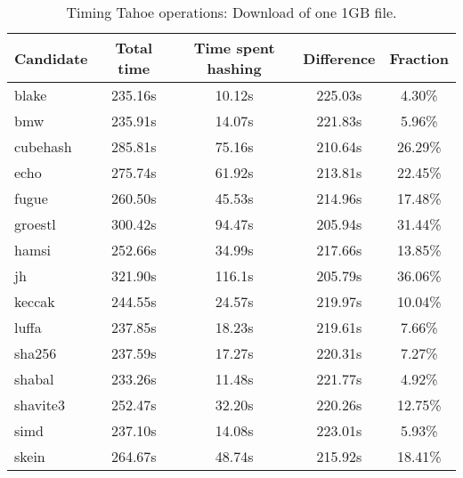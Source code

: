 \begin{table}[h]
  \centering
  \begin{tabular}{ | l | c | c | c | c | }
    \hline
    Candidate & Total time & Time spent hashing & Difference & Fraction \\ \hline
    blake & 235.16s & 10.12s & 225.03s & 4.30\% \\ \hline
    bmw & 235.91s & 14.07s & 221.83s & 5.96\% \\ \hline
    cubehash & 285.81s & 75.16s & 210.64s & 26.29\% \\ \hline
    echo & 275.74s & 61.92s & 213.81s & 22.45\% \\ \hline
    fugue & 260.50s & 45.53s & 214.96s & 17.48\% \\ \hline
    groestl & 300.42s & 94.47s & 205.94s & 31.44\% \\ \hline
    hamsi & 252.66s & 34.99s & 217.66s & 13.85\% \\ \hline
    jh & 321.90s & 116.1s & 205.79s & 36.06\% \\ \hline
    keccak & 244.55s & 24.57s & 219.97s & 10.04\% \\ \hline
    luffa & 237.85s & 18.23s & 219.61s & 7.66\% \\ \hline
    sha256 & 237.59s & 17.27s & 220.31s & 7.27\% \\ \hline
    shabal & 233.26s & 11.48s & 221.77s & 4.92\% \\ \hline
    shavite3 & 252.47s & 32.20s & 220.26s & 12.75\% \\ \hline
    simd & 237.10s & 14.08s & 223.01s & 5.93\% \\ \hline
    skein & 264.67s & 48.74s & 215.92s & 18.41\% \\ \hline
  \end{tabular}
  \caption{Timing Tahoe operations: Download of one 1GB file.}
  \label{tbl:hashingtimes:get1gb}
\end{table}
